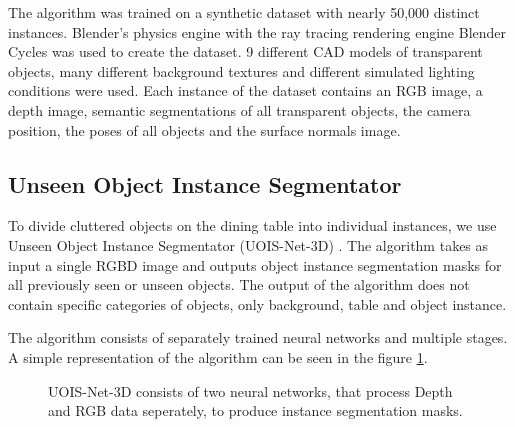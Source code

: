 \documentclass[10pt,twocolumn,letterpaper]{article}
\begin{document}
The algorithm was trained on a synthetic dataset with nearly 50,000 distinct instances. Blender's physics engine with the ray tracing rendering engine Blender Cycles was used to create the dataset. 9 different CAD models of transparent objects, many different background textures and different simulated lighting conditions were used. Each instance of the dataset contains an RGB image, a depth image, semantic segmentations of all transparent objects, the camera position, the poses of all objects and the surface normals image. 



\subsection{Unseen Object Instance Segmentator}

To divide cluttered objects on the dining table into individual instances, we use Unseen Object Instance Segmentator (UOIS-Net-3D) \cite{Xie_Xiang_Mousavian_Fox_2021}. The algorithm takes as input a single RGBD image and outputs object instance segmentation masks for all previously seen or unseen objects. The output of the algorithm does not contain specific categories of objects, only background, table and object instance.

The algorithm consists of separately trained neural networks and multiple stages. A simple representation of the algorithm can be seen in the figure \ref{fig:UOIS-scheme}.

\begin{figure}
\begin{center}
\end{center}
   \caption{UOIS-Net-3D consists of two neural networks, that process Depth and RGB data seperately, to produce instance segmentation masks.}
\label{fig:UOIS-scheme}
\end{figure}
\end{document}
